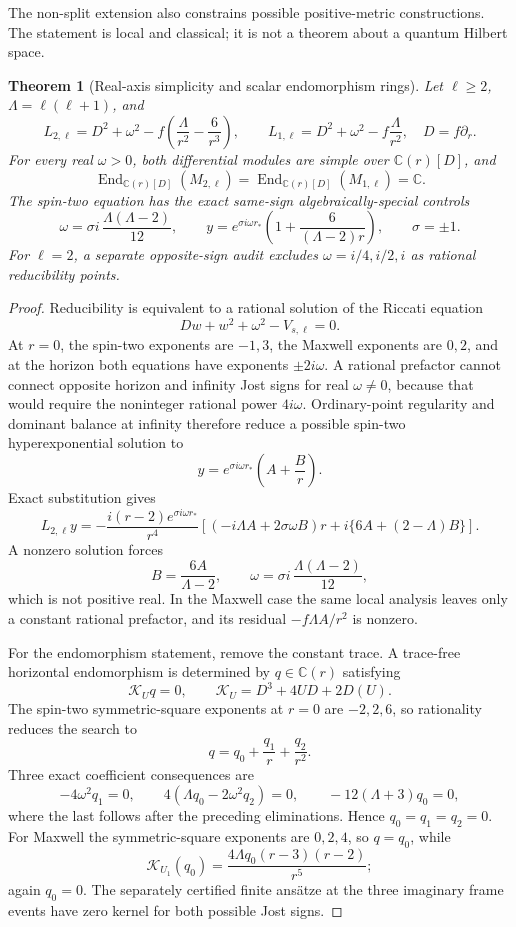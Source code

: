 \documentclass[11pt]{article}
\newtheorem{theorem}{Theorem}[section]
\theoremstyle{definition}
\theoremstyle{remark}
\newcommand{\C}{\mathbb C}
\begin{document}
The non-split extension also constrains possible positive-metric
constructions.  The statement is local and classical; it is not a theorem
about a quantum Hilbert space.

\begin{theorem}[Real-axis simplicity and scalar endomorphism rings]
\label{thm:rw-simple}
Let \(\ell\ge2\), \(\Lambda=\ell(\ell+1)\), and
\[
L_{2,\ell}
=D^2+\omega^2
-f\left(\frac{\Lambda}{r^2}-\frac6{r^3}\right),
\qquad
L_{1,\ell}
=D^2+\omega^2-f\frac{\Lambda}{r^2},
\quad
D=f\partial_r.
\]
For every real \(\omega>0\), both differential modules are simple over
\(\C(r)[D]\), and
\[
\operatorname{End}_{\C(r)[D]}(M_{2,\ell})
=
\operatorname{End}_{\C(r)[D]}(M_{1,\ell})
=\C.
\]
The spin-two equation has the exact same-sign algebraically-special controls
\[
\omega=\sigma i\,\frac{\Lambda(\Lambda-2)}{12},
\qquad
y=e^{\sigma i\omega r_*}
\left(1+\frac{6}{(\Lambda-2)r}\right),
\qquad \sigma=\pm1.
\]
For \(\ell=2\), a separate opposite-sign audit excludes
\(\omega=i/4,i/2,i\) as rational reducibility points.
\end{theorem}

\begin{proof}
Reducibility is equivalent to a rational solution of the Riccati equation
\[
Dw+w^2+\omega^2-V_{s,\ell}=0.
\]
At \(r=0\), the spin-two exponents are \(-1,3\), the Maxwell exponents are
\(0,2\), and at the horizon both equations have exponents
\(\pm2i\omega\).  A rational prefactor cannot connect opposite horizon and
infinity Jost signs for real \(\omega\ne0\), because that would require the
noninteger rational power \(4i\omega\).  Ordinary-point regularity and
dominant balance at infinity therefore reduce a possible spin-two
hyperexponential solution to
\[
y=e^{\sigma i\omega r_*}\left(A+\frac Br\right).
\]
Exact substitution gives
\[
L_{2,\ell}y=
-\frac{i(r-2)e^{\sigma i\omega r_*}}{r^4}
\left[
(-i\Lambda A+2\sigma\omega B)r
+i\{6A+(2-\Lambda)B\}
\right].
\]
A nonzero solution forces
\[
B=\frac{6A}{\Lambda-2},
\qquad
\omega=\sigma i\,\frac{\Lambda(\Lambda-2)}{12},
\]
which is not positive real.  In the Maxwell case the same local analysis
leaves only a constant rational prefactor, and its residual
\(-f\Lambda A/r^2\) is nonzero.

For the endomorphism statement, remove the constant trace.  A trace-free
horizontal endomorphism is determined by \(q\in\C(r)\) satisfying
\[
\mathcal K_Uq=0,
\qquad
\mathcal K_U=D^3+4UD+2D(U).
\]
The spin-two symmetric-square exponents at \(r=0\) are \(-2,2,6\), so
rationality reduces the search to
\[
q=q_0+\frac{q_1}{r}+\frac{q_2}{r^2}.
\]
Three exact coefficient consequences are
\[
-4\omega^2q_1=0,\qquad
4(\Lambda q_0-2\omega^2q_2)=0,\qquad
-12(\Lambda+3)q_0=0,
\]
where the last follows after the preceding eliminations.  Hence
\(q_0=q_1=q_2=0\).  For Maxwell the symmetric-square exponents are
\(0,2,4\), so \(q=q_0\), while
\[
\mathcal K_{U_1}(q_0)
=\frac{4\Lambda q_0(r-3)(r-2)}{r^5};
\]
again \(q_0=0\).  The separately certified finite ans\"atze at the three
imaginary frame events have zero kernel for both possible Jost signs.
\end{proof}
\end{document}
